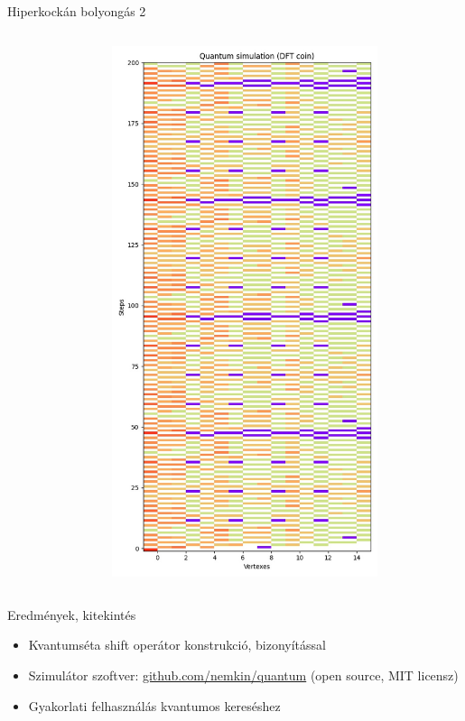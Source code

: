 \documentclass[aspectratio=169]{beamer}
\begin{document}
\begin{frame}{Hiperkockán bolyongás 2}
\begin{columns}[onlytextwidth]
\begin{column}{.25\textwidth}
\begin{figure}
      \end{figure}
    \end{column}
    \begin{column}{.25\textwidth}
      \begin{figure}
        \includegraphics[width=0.9\textwidth]{./tdk_figures/results/hypercube/dft.jpg}
      \end{figure}
    \end{column}
    \begin{column}{.25\textwidth}
    \end{column}
  \end{columns}
\end{frame}

\begin{frame}{Eredmények, kitekintés}
\begin{itemize}
    \item Kvantumséta shift operátor konstrukció, bizonyítással
    \item Szimulátor szoftver: \url{github.com/nemkin/quantum} (open source, MIT licensz)
    \item Gyakorlati felhasználás kvantumos kereséshez
\end{itemize}
\end{frame}
\end{document}
